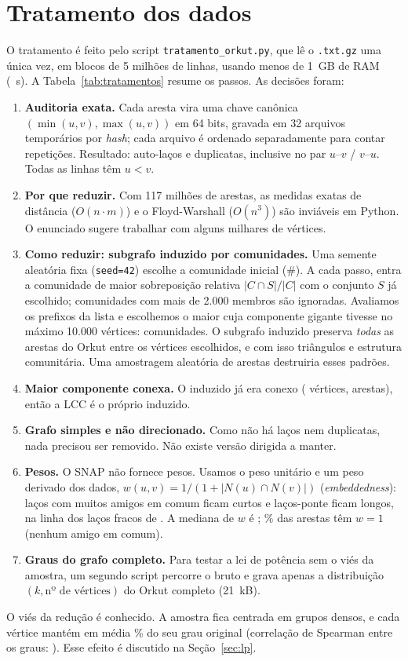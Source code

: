 \IfFileExists{webmedia.cls}{\documentclass[sigconf]{webmedia}}{\documentclass[sigconf]{acmart}}
\begin{document}
\section{Tratamento dos dados}\label{sec:tratamento}
O tratamento é feito pelo script \texttt{tratamento\_orkut.py}, que lê o \texttt{.txt.gz} uma única vez, em blocos de 5 milhões de linhas, usando menos de 1~GB de RAM (\origSegLeitura{}~s). A Tabela~\ref{tab:tratamentos} resume os passos. As decisões foram:
\begin{enumerate}
\item \textbf{Auditoria exata.} Cada aresta vira uma chave canônica $(\min(u,v), \max(u,v))$ em 64 bits, gravada em 32 arquivos temporários por \emph{hash}; cada arquivo é ordenado separadamente para contar repetições. Resultado: \origLacos{} auto-laços e \origDuplicadas{} duplicatas, inclusive no par $u$--$v$ / $v$--$u$. Todas as linhas têm $u < v$.
\item \textbf{Por que reduzir.} Com 117 milhões de arestas, as medidas exatas de distância ($O(n \cdot m)$) e o Floyd-Warshall ($O(n^3)$) são inviáveis em Python. O enunciado sugere trabalhar com alguns milhares de vértices.
\item \textbf{Como reduzir: subgrafo induzido por comunidades.} Uma semente aleatória fixa (\texttt{seed=42}) escolhe a comunidade inicial (\#\sementeComunidade). A cada passo, entra a comunidade de maior sobreposição relativa $|C \cap S|/|C|$ com o conjunto $S$ já escolhido; comunidades com mais de 2.000 membros são ignoradas. Avaliamos os prefixos da lista e escolhemos o maior cuja componente gigante tivesse no máximo 10.000 vértices: \nComunidadesSel{} comunidades. O subgrafo induzido preserva \emph{todas} as arestas do Orkut entre os vértices escolhidos, e com isso triângulos e estrutura comunitária. Uma amostragem aleatória de arestas destruiria esses padrões.
\item \textbf{Maior componente conexa.} O induzido já era conexo (\indV{} vértices, \indE{} arestas), então a LCC é o próprio induzido.
\item \textbf{Grafo simples e não direcionado.} Como não há laços nem duplicatas, nada precisou ser removido. Não existe versão dirigida a manter.
\item \textbf{Pesos.} O SNAP não fornece pesos. Usamos o peso unitário e um peso derivado dos dados, $w(u,v) = 1/(1 + |N(u) \cap N(v)|)$ (\emph{embeddedness}): laços com muitos amigos em comum ficam curtos e laços-ponte ficam longos, na linha dos laços fracos de \citet{granovetter1973}. A mediana de $w$ é \wMediana; \wFracUm\% das arestas têm $w = 1$ (nenhum amigo em comum).
\item \textbf{Graus do grafo completo.} Para testar a lei de potência sem o viés da amostra, um segundo script percorre o bruto e grava apenas a distribuição $(k, \text{nº de vértices})$ do Orkut completo (21~kB).
\end{enumerate}
O viés da redução é conhecido. A amostra fica centrada em grupos densos, e cada vértice mantém em média \grauPreservado\% do seu grau original (correlação de Spearman entre os graus: \spearmanGrauOrig). Esse efeito é discutido na Seção~\ref{sec:lp}.
\end{document}
